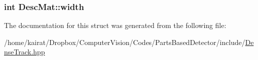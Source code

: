\subsubsection[{width}]{\setlength{\rightskip}{0pt plus 5cm}int Desc\+Mat\+::width}\label{structDescMat_aeddd5ec25bb3e937e94b0d0c8b639618}


The documentation for this struct was generated from the following file\+:\begin{DoxyCompactItemize}
\item 
/home/kairat/\+Dropbox/\+Computer\+Vision/\+Codes/\+Parts\+Based\+Detector/include/\hyperlink{DenseTrack_8hpp}{Dense\+Track.\+hpp}\end{DoxyCompactItemize}
